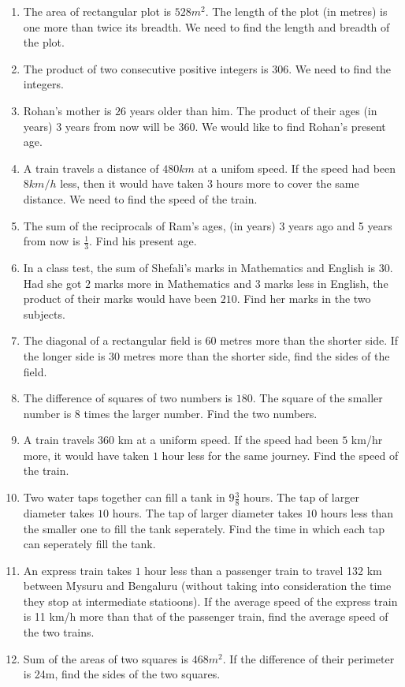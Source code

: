 \begin{enumerate}[label=\thesubsection.\arabic*,ref=\thesubsection.\theenumi,resume*]
\item The area of rectangular plot is $528m^2$. The length of the plot (in metres) is one more than twice its breadth. We need to find the length and breadth of the plot.
\item The product of two consecutive positive integers is $306$. We need to find the integers.
\item Rohan's mother is $26$ years older than him. The product of their ages (in years) $3$ years from now will be $360$. We would like to find Rohan's present age.
\item A train travels a distance of $480km$ at a unifom speed. If the speed had been $8km/h$ less, then it would have taken $3 $ hours more to cover the same distance. We need to find the speed of the train.
\item The sum of the reciprocals of Ram's ages, (in years) 3 years ago and 5 years from now is $\frac{1}{3}$. Find his present age.
\item In a class test, the sum of Shefali's  marks in Mathematics and English is $30$. Had she got $2$ marks more in Mathematics and $3$ marks less in English, the product of their marks would have been $210$. Find her marks in the two subjects. 
\item The diagonal of a rectangular field is $60$ metres more than the shorter side. If the longer side is $30$ metres more than the shorter side, find the sides of the field.
\item The difference of squares of two numbers is $180$. The square of the smaller number is $8$ times the larger number. Find the two numbers.
\item A train travels $360$ km at a uniform speed. If the speed had been $5$ km/hr more, it would have taken $1$ hour less for the same journey. Find the speed of the train.
\item Two water taps together can fill a tank in $9\frac{3}{8}$ hours. The tap of larger diameter takes $10$ hours. The tap of larger diameter takes $10$ hours less than the smaller one to fill the tank seperately. Find the time in which each tap can seperately fill the  tank.
\item An express train takes $1$ hour less than a passenger train to travel 132 km between Mysuru and Bengaluru (without taking into consideration the time they stop at intermediate statioons). If the average speed of the express train is 11 km/h more than that of the passenger train, find the average speed of the two trains.
\item Sum of the areas of two squares is $468m^2$. If the difference of their perimeter is 24m, find the sides of the two squares.  

\end{enumerate}
